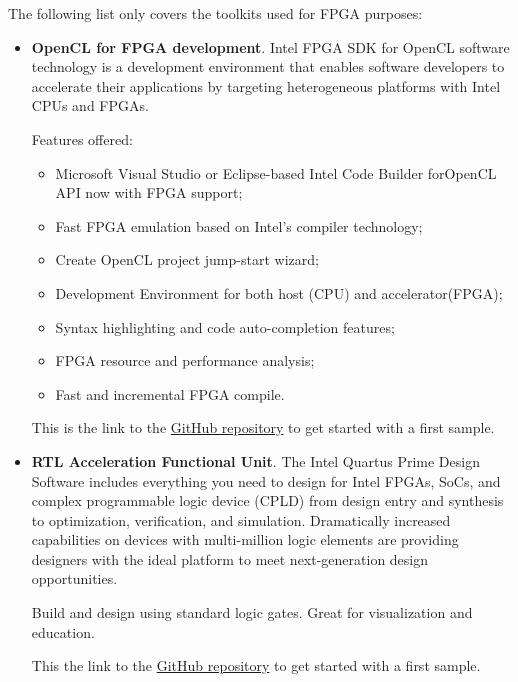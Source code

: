 \documentclass[a4paper]{article}
\begin{document}
    \noindent
    The following list only covers the toolkits used for FPGA purposes:
    \begin{itemize}
        \item \textbf{OpenCL for FPGA development}. Intel FPGA SDK for OpenCL software technology is a development environment that enables software developers to accelerate their applications by targeting heterogeneous platforms with Intel CPUs and FPGAs.
        
        Features offered:
        \begin{itemize}
            \item Microsoft Visual Studio or Eclipse-based Intel Code Builder for\newline OpenCL API now with FPGA support;

            \item Fast FPGA emulation based on Intel's compiler technology;

            \item Create OpenCL project jump-start wizard;
            
            \item Development Environment for both host (CPU) and accelerator\newline (FPGA);

            \item Syntax highlighting and code auto-completion features;
            
            \item FPGA resource and performance analysis;
            
            \item Fast and incremental FPGA compile.
        \end{itemize}
        This is the link to the \href{https://github.com/intel/FPGA-Devcloud/tree/master/main/QuickStartGuides/OpenCL_Program_PAC_Quickstart}{GitHub repository} to get started with a first sample.

        \item \textbf{RTL Acceleration Functional Unit}. The Intel Quartus Prime Design Software includes everything you need to design for Intel FPGAs, SoCs, and complex programmable logic device (CPLD) from design entry and synthesis to optimization, verification, and simulation. Dramatically increased capabilities on devices with multi-million logic elements are providing designers with the ideal platform to meet next-generation design opportunities.

        Build and design using standard logic gates. Great for visualization and education.

        This the link to the \href{https://github.com/intel/FPGA-Devcloud/tree/master/main/QuickStartGuides/RTL_AFU_Program_PAC_Quickstart}{GitHub repository} to get started with a first sample.
    \end{itemize}
\end{document}
